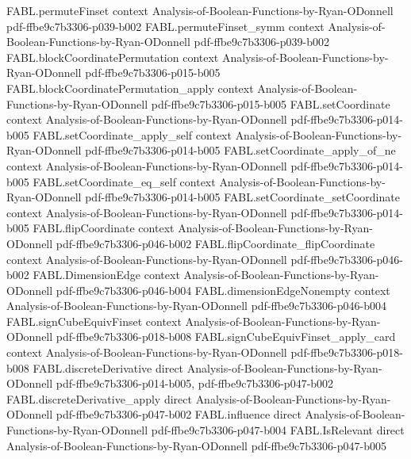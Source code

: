 \begin{theorem}
\proofstep
  {FABL.permuteFinset}
  {context}
  {Analysis-of-Boolean-Functions-by-Ryan-ODonnell}
  {pdf-ffbe9c7b3306-p039-b002}
\proofstep
  {FABL.permuteFinset_symm}
  {context}
  {Analysis-of-Boolean-Functions-by-Ryan-ODonnell}
  {pdf-ffbe9c7b3306-p039-b002}
\proofstep
  {FABL.blockCoordinatePermutation}
  {context}
  {Analysis-of-Boolean-Functions-by-Ryan-ODonnell}
  {pdf-ffbe9c7b3306-p015-b005}
\proofstep
  {FABL.blockCoordinatePermutation_apply}
  {context}
  {Analysis-of-Boolean-Functions-by-Ryan-ODonnell}
  {pdf-ffbe9c7b3306-p015-b005}
\proofstep
  {FABL.setCoordinate}
  {context}
  {Analysis-of-Boolean-Functions-by-Ryan-ODonnell}
  {pdf-ffbe9c7b3306-p014-b005}
\proofstep
  {FABL.setCoordinate_apply_self}
  {context}
  {Analysis-of-Boolean-Functions-by-Ryan-ODonnell}
  {pdf-ffbe9c7b3306-p014-b005}
\proofstep
  {FABL.setCoordinate_apply_of_ne}
  {context}
  {Analysis-of-Boolean-Functions-by-Ryan-ODonnell}
  {pdf-ffbe9c7b3306-p014-b005}
\proofstep
  {FABL.setCoordinate_eq_self}
  {context}
  {Analysis-of-Boolean-Functions-by-Ryan-ODonnell}
  {pdf-ffbe9c7b3306-p014-b005}
\proofstep
  {FABL.setCoordinate_setCoordinate}
  {context}
  {Analysis-of-Boolean-Functions-by-Ryan-ODonnell}
  {pdf-ffbe9c7b3306-p014-b005}
\proofstep
  {FABL.flipCoordinate}
  {context}
  {Analysis-of-Boolean-Functions-by-Ryan-ODonnell}
  {pdf-ffbe9c7b3306-p046-b002}
\proofstep
  {FABL.flipCoordinate_flipCoordinate}
  {context}
  {Analysis-of-Boolean-Functions-by-Ryan-ODonnell}
  {pdf-ffbe9c7b3306-p046-b002}
\proofstep
  {FABL.DimensionEdge}
  {context}
  {Analysis-of-Boolean-Functions-by-Ryan-ODonnell}
  {pdf-ffbe9c7b3306-p046-b004}
\proofstep
  {FABL.dimensionEdgeNonempty}
  {context}
  {Analysis-of-Boolean-Functions-by-Ryan-ODonnell}
  {pdf-ffbe9c7b3306-p046-b004}
\proofstep
  {FABL.signCubeEquivFinset}
  {context}
  {Analysis-of-Boolean-Functions-by-Ryan-ODonnell}
  {pdf-ffbe9c7b3306-p018-b008}
\proofstep
  {FABL.signCubeEquivFinset_apply_card}
  {context}
  {Analysis-of-Boolean-Functions-by-Ryan-ODonnell}
  {pdf-ffbe9c7b3306-p018-b008}
\proofstep
  {FABL.discreteDerivative}
  {direct}
  {Analysis-of-Boolean-Functions-by-Ryan-ODonnell}
  {pdf-ffbe9c7b3306-p014-b005,
    pdf-ffbe9c7b3306-p047-b002}
\proofstep
  {FABL.discreteDerivative_apply}
  {direct}
  {Analysis-of-Boolean-Functions-by-Ryan-ODonnell}
  {pdf-ffbe9c7b3306-p047-b002}
\proofstep
  {FABL.influence}
  {direct}
  {Analysis-of-Boolean-Functions-by-Ryan-ODonnell}
  {pdf-ffbe9c7b3306-p047-b004}
\proofstep
  {FABL.IsRelevant}
  {direct}
  {Analysis-of-Boolean-Functions-by-Ryan-ODonnell}
  {pdf-ffbe9c7b3306-p047-b005}
\proofstep

\end{theorem}
